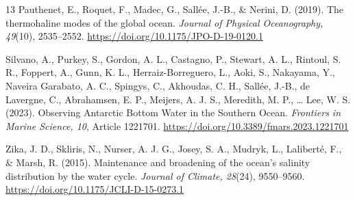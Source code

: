 \documentclass[12pt,a4paper]{article}
\begin{document}
{\begin{thebibliography}{13}
Pauthenet, E., Roquet, F., Madec, G., Sallée, J.-B., \& Nerini, D. (2019).
The thermohaline modes of the global ocean. \emph{Journal of Physical
Oceanography, 49}(10), 2535--2552.
\url{https://doi.org/10.1175/JPO-D-19-0120.1}

Silvano, A., Purkey, S., Gordon, A. L., Castagno, P., Stewart, A. L.,
Rintoul, S. R., Foppert, A., Gunn, K. L., Herraiz-Borreguero, L., Aoki, S.,
Nakayama, Y., Naveira Garabato, A. C., Spingys, C., Akhoudas, C. H., Sallée,
J.-B., de Lavergne, C., Abrahamsen, E. P., Meijers, A. J. S., Meredith, M.
P., \ldots{} Lee, W. S. (2023). Observing Antarctic Bottom Water in the
Southern Ocean. \emph{Frontiers in Marine Science, 10}, Article 1221701.
\url{https://doi.org/10.3389/fmars.2023.1221701}

Zika, J. D., Skliris, N., Nurser, A. J. G., Josey, S. A., Mudryk, L.,
Laliberté, F., \& Marsh, R. (2015). Maintenance and broadening of the ocean's
salinity distribution by the water cycle. \emph{Journal of Climate, 28}(24),
9550--9560. \url{https://doi.org/10.1175/JCLI-D-15-0273.1}

%
%
%
%
%
%

\end{thebibliography}
}
\end{document}
